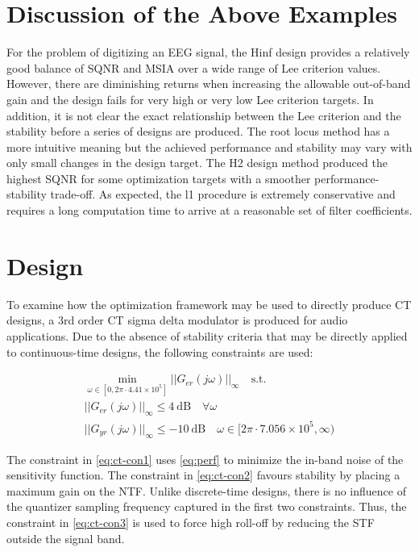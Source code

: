 \section{Discussion of the Above Examples}
For the problem of digitizing an \gls{EEG} signal, the \gls{Hinf} design provides a relatively good balance of \gls{SQNR} and \gls{MSIA} over a wide range of Lee criterion values. However, there are diminishing returns when increasing the allowable out-of-band gain and the design fails for very high or very low Lee criterion targets. In addition, it is not clear the exact relationship between the Lee criterion and the stability before a series of designs are produced. The root locus method has a more intuitive meaning but the achieved performance and stability may vary with only small changes in the design target. The \gls{H2} design method produced the highest \gls{SQNR} for some optimization targets with a smoother performance-stability trade-off. As expected, the \gls{l1} procedure is extremely conservative and requires a long computation time to arrive at a reasonable set of filter coefficients.

\section{ Design}
\label{sec:ex-ct}

To examine how the optimization framework may be used to directly produce \gls{CT} designs, a 3rd order \gls{CT} sigma delta modulator is produced for audio applications. Due to the absence of stability criteria that may be directly applied to continuous-time designs, the following constraints are used:

\begin{gather}
	\min_{\omega \in [0, 2\pi\cdot4.41\times10^5]} ||G_{er}(j\omega)||_\infty \quad \textrm{s.t.} \label{eq:ct-con1} \\
	||G_{er}(j\omega)||_\infty \leq \SI{4}{\deci\bel} \quad \forall \omega \label{eq:ct-con2} \\
	||G_{yr}(j\omega)||_\infty \leq \SI{-10}{\deci\bel} \quad \omega \in [2\pi\cdot7.056\times10^5, \infty) \label{eq:ct-con3}
\end{gather}

The constraint in \autoref{eq:ct-con1} uses \autoref{eq:perf} to minimize the in-band noise of the sensitivity function. The constraint in \autoref{eq:ct-con2} favours stability by placing a maximum gain on the \gls{NTF}. Unlike discrete-time designs, there is no influence of the quantizer sampling frequency captured in the first two constraints. Thus, the constraint in \autoref{eq:ct-con3} is used to force high roll-off by reducing the \gls{STF} outside the signal band.

